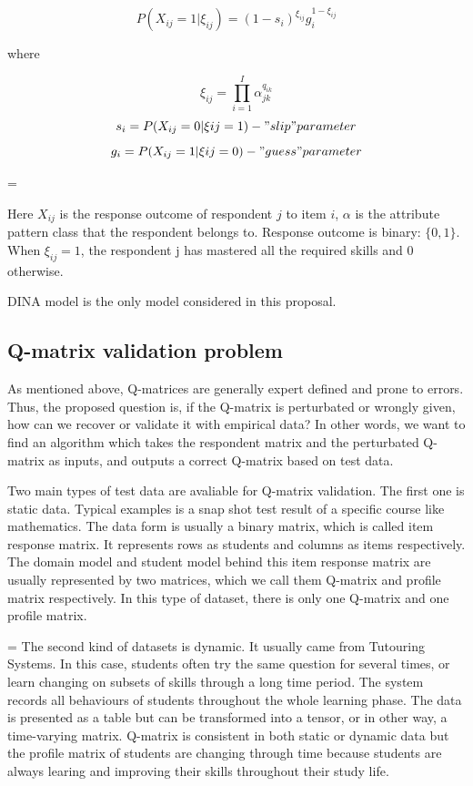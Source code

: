 \documentclass[11pt]{article}
\begin{document}
  
$$P (X_{ij}=1|\xi_{ij})=(1-s_i)^{\xi_{ij}}g_i^{1-\xi_{ij}}$$  

where 

$$\xi_{ij}=\prod\limits_{i=1}^I \alpha_{jk}^{q_{ik}}$$
$$ s_i= P(X_{ij}=0|\xi{ij}=1)-"slip" parameter $$
$$ g_i= P(X_{ij}=1|\xi{ij}=0)-"guess" parameter $$




  
\parskip = \baselineskip


Here $X_{ij}$ is the response outcome of respondent $j$ to item $i$, $\alpha$ is the attribute pattern class that the respondent belongs to. Response outcome is binary: $\{0,1\}$. When $\xi_{ij}=1$, the respondent j has mastered all the required skills and 0 otherwise. 

DINA model is the only model considered in this proposal.  
  









  
\subsection{Q-matrix validation problem}
As mentioned above, Q-matrices are generally expert defined and prone to errors. Thus, the proposed question is, if the Q-matrix is perturbated or wrongly given, how can we recover or validate it with empirical data? In other words, we want to find an algorithm which takes the respondent matrix and the perturbated Q-matrix as inputs, and outputs a correct Q-matrix based on test data.

Two main types of test data are avaliable for Q-matrix validation. The first one is static data. Typical examples is a snap shot test result of a specific course like mathematics. The data form is usually a binary matrix, which is called item response matrix. It represents rows as students and columns as items respectively. The domain model and student model behind this item response matrix are usually represented by two matrices, which we call them Q-matrix and profile matrix respectively. In this type of dataset, there is only one Q-matrix and one profile matrix.

\parskip = \baselineskip 
The second kind of datasets is dynamic. It usually came from Tutouring Systems. In this case, students often try the same question for several times, or learn changing on subsets of skills through a long time period. The system records all behaviours of students throughout the whole learning phase. The data is presented as a table but can be transformed into a tensor, or in other way, a time-varying matrix. Q-matrix is consistent in both static or dynamic data but the profile matrix of students are changing through time because students are always learing and improving their skills throughout their study life.
\end{document}
